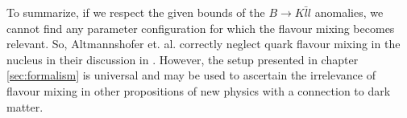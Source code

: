 \clearpage
To summarize, if we respect the given bounds of the $B\rightarrow K\bar{l}l$ anomalies, we cannot find any parameter configuration for which the flavour mixing becomes relevant. So, Altmannshofer et. al. correctly neglect quark flavour mixing in the nucleus in their discussion in \cite{Z}. However, the setup presented in chapter \ref{sec:formalism} is universal and may be used to ascertain the irrelevance of flavour mixing in other propositions of new physics with a connection to dark matter.